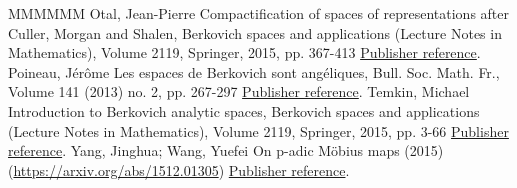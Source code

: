 \begin{thebibliography}{MMMMMM}
 Otal, Jean-Pierre Compactification of spaces of representations after Culler, Morgan and Shalen, Berkovich spaces and applications (Lecture Notes in Mathematics), Volume 2119, Springer, 2015, pp. 367-413 \href{https://ahl.centre-mersenne.org/item/AHL_2019__2__515_0/#otal}{Publisher reference}.
 Poineau, Jérôme Les espaces de Berkovich sont angéliques, Bull. Soc. Math. Fr., Volume 141 (2013) no. 2, pp. 267-297 \href{https://ahl.centre-mersenne.org/item/AHL_2019__2__515_0/#poineau}{Publisher reference}.
 Temkin, Michael Introduction to Berkovich analytic spaces, Berkovich spaces and applications (Lecture Notes in Mathematics), Volume 2119, Springer, 2015, pp. 3-66 \href{https://ahl.centre-mersenne.org/item/AHL_2019__2__515_0/#temkin}{Publisher reference}.
 Yang, Jinghua; Wang, Yuefei On p-adic Möbius maps (2015) (\url{https://arxiv.org/abs/1512.01305}) \href{https://ahl.centre-mersenne.org/item/AHL_2019__2__515_0/#yang-wang}{Publisher reference}.
\end{thebibliography}
